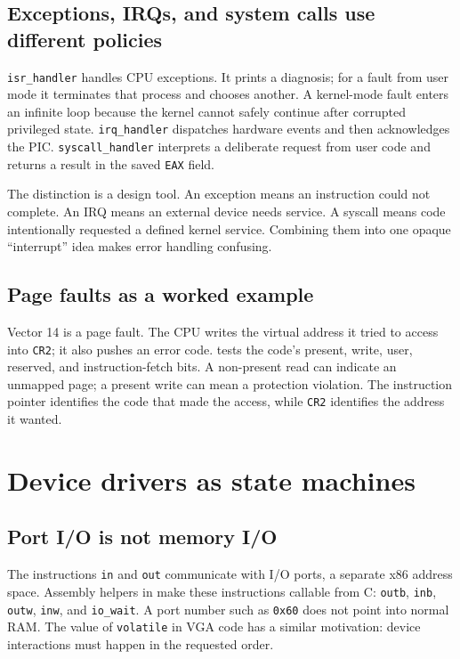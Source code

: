 \section{Exceptions, IRQs, and system calls use different policies}
\texttt{isr\_handler} handles CPU exceptions. It prints a diagnosis; for a fault from user mode it terminates that process and chooses another. A kernel-mode fault enters an infinite loop because the kernel cannot safely continue after corrupted privileged state. \texttt{irq\_handler} dispatches hardware events and then acknowledges the PIC. \texttt{syscall\_handler} interprets a deliberate request from user code and returns a result in the saved \texttt{EAX} field.

The distinction is a design tool. An exception means an instruction could not complete. An IRQ means an external device needs service. A syscall means code intentionally requested a defined kernel service. Combining them into one opaque ``interrupt'' idea makes error handling confusing.

\section{Page faults as a worked example}
Vector 14 is a page fault. The CPU writes the virtual address it tried to access into \texttt{CR2}; it also pushes an error code.  tests the code's present, write, user, reserved, and instruction-fetch bits. A non-present read can indicate an unmapped page; a present write can mean a protection violation. The instruction pointer identifies the code that made the access, while \texttt{CR2} identifies the address it wanted.


\chapter{Device drivers as state machines}
\section{Port I/O is not memory I/O}
The instructions \texttt{in} and \texttt{out} communicate with I/O ports, a separate x86 address space. Assembly helpers in  make these instructions callable from C: \texttt{outb}, \texttt{inb}, \texttt{outw}, \texttt{inw}, and \texttt{io\_wait}. A port number such as \texttt{0x60} does not point into normal RAM. The value of \texttt{volatile} in VGA code has a similar motivation: device interactions must happen in the requested order.

